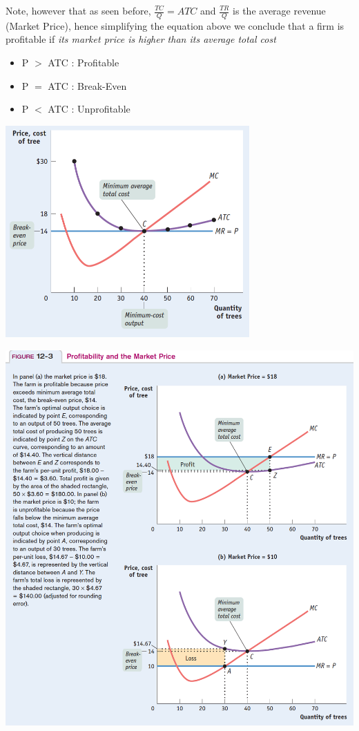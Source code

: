 \documentclass[english,course]{Notes}
\newcommand{\ita}[1]{\textit{#1}}
\begin{document}
\par{Note, however that as seen before, $\frac{TC}{Q} = ATC$ and $\frac{TR}{Q}$ is the average revenue (Market Price), hence simplifying the equation above we conclude that a firm is profitable if \ita{its market price is higher than its average total cost}

\begin{itemize}
	\item P $>$ ATC : Profitable
	\item P $=$ ATC : Break-Even
	\item P $<$ ATC : Unprofitable
\end{itemize}


\includegraphics[width=0.7\textwidth]{profit}



\newpage
\includegraphics[width=\textwidth]{profit2}

}
\end{document}
